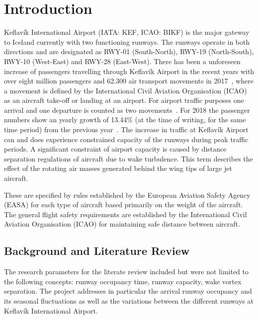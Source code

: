 \chapter{Introduction\label{cha:introduction}}

Keflavík International Airport (IATA: KEF, ICAO: BIKF) is the major gateway to Iceland currently with two functioning runways. The runways operate in both directions and are designated as RWY-01 (South-North), RWY-19 (North-South), RWY-10 (West-East) and RWY-28 (East-West). 
There has been a unforeseen increase of passengers travelling through Keflavík Airport in the recent years with over eight million passengers and 62.300 air transport movements in 2017~\cite{isavia_facts_2017}, where a movement is defined by the International Civil Aviation Organisation (ICAO) as an aircraft take-off or landing at an airport. For airport traffic purposes one arrival and one departure is counted as two movements~\cite{aircraft_movement}. For 2018 the passenger numbers show an yearly growth of 13.44\% (at the time of writing, for the same time period) from the previous year~\cite{isavia_pass_statistics_2018}. The increase in traffic at Keflavík Airport can and does experience constrained capacity of the runways during peak traffic periods. 
A significant constraint of airport capacity is caused by distance separation regulations of aircraft due to wake turbulence. This term describes the effect of the rotating air masses generated behind the wing tips of large jet aircraft. 

These are specified by rules established by the European Aviation Safety Agency (EASA) for each type of aircraft based primarily on the weight of the aircraft. The general flight safety requirements are established by the International Civil Aviation Organisation (ICAO) for maintaining safe distance between aircraft.

\section{Background and Literature Review}
The research parameters for the literate review included but were not limited to the following concepts: runway occupancy time, runway capacity, wake vortex separation. The project addresses in particular the arrival runway occupancy and its seasonal fluctuations as well as the variations between the different runways at Keflavík International Airport.

